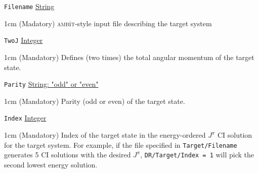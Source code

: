 \documentclass{report}
\newcommand{\ambit}{\textsc{amb}{\footnotesize i}\textsc{t}}
\begin{document}
\texttt{Filename} \uline{String}
\begin{adjustwidth}{1cm}{}
(Madatory) \ambit-style input file describing the target system
\end{adjustwidth}

\texttt{TwoJ} \uline{Integer}
\begin{adjustwidth}{1cm}{}
(Mandatory) Defines (two times) the total angular momentum of the target state.
\end{adjustwidth}

\texttt{Parity} \uline{String: "odd" or "even"}
\begin{adjustwidth}{1cm}{}
(Mandatory) Parity (odd or even) of the target state.
\end{adjustwidth}

\texttt{Index} \uline{Integer}
\begin{adjustwidth}{1cm}{}
(Mandatory) Index of the target state in the energy-ordered $J^{\pi}$ CI solution for the target system. 
For example, if the file specified in \texttt{Target/Filename} generates 5 CI solutions with the desired
$J^{\pi}$, \texttt{DR/Target/Index = 1} will pick the second lowest energy solution.
\end{adjustwidth}
\end{document}
